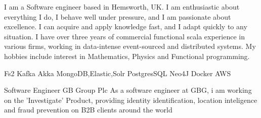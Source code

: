 \documentclass[a4paper]{ReadableCV}
\begin{document}
	
	
	
	
	
	
	
	\showHeader
	
	
	
	I am a Software engineer based in Hemsworth, UK. I am enthusiastic about everything I do, I behave well under pressure, and I am passionate about excellence. I can acquire and apply knowledge fast, and I adapt quickly to any situation. I have over three years of commercial functional scala experience in various firms, working in data-intense event-sourced and distributed systems. My hobbies include interest in Mathematics, Physics and Functional programming.
	
	
	{Fs2}
	{Kafka}
	{Akka}
	{MongoDB,Elastic,Solr}
	{PostgresSQL}
	{Neo4J}
	{Docker}
	{AWS}
	
	
	
	{Software Engineer}
	{GB Group Plc}
	{As a software engineer at GBG, i am working on the 'Investigate' Product, providing identity identification, location inteligence and fraud prevention on B2B clients around the world}
	
\end{document}
